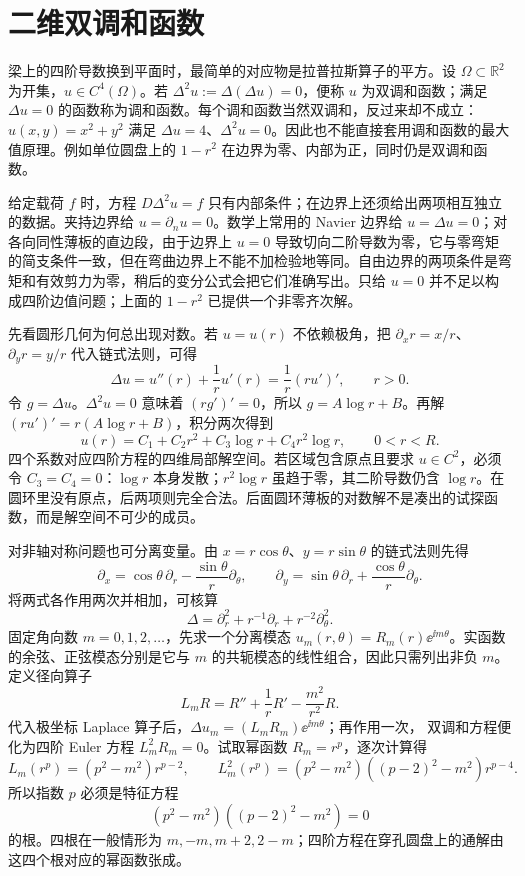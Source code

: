 \section{二维双调和函数}
\label{sec:phys-cont-biharmonic-primer}

梁上的四阶导数换到平面时，最简单的对应物是拉普拉斯算子的平方。设 $\Omega\subset\mathbb R^2$ 为开集，$u\in C^4(\Omega)$。若 $\Delta^2u:=\Delta(\Delta u)=0$，便称 $u$ 为双调和函数；满足 $\Delta u=0$ 的函数称为调和函数。每个调和函数当然双调和，反过来却不成立：$u(x,y)=x^2+y^2$ 满足 $\Delta u=4$、$\Delta^2u=0$。因此也不能直接套用调和函数的最大值原理。例如单位圆盘上的 $1-r^2$ 在边界为零、内部为正，同时仍是双调和函数。

给定载荷 $f$ 时，方程 $D\Delta^2u=f$ 只有内部条件；在边界上还须给出两项相互独立的数据。夹持边界给 $u=\partial_nu=0$。数学上常用的 Navier 边界给 $u=\Delta u=0$；对各向同性薄板的直边段，由于边界上 $u=0$ 导致切向二阶导数为零，它与零弯矩的简支条件一致，但在弯曲边界上不能不加检验地等同。自由边界的两项条件是弯矩和有效剪力为零，稍后的变分公式会把它们准确写出。只给 $u=0$ 并不足以构成四阶边值问题；上面的 $1-r^2$ 已提供一个非零齐次解。

先看圆形几何为何总出现对数。若 $u=u(r)$ 不依赖极角，把 $\partial_xr=x/r$、$\partial_yr=y/r$ 代入链式法则，可得
\begin{equation}
\Delta u=u''(r)+\frac1r u'(r)=\frac1r(ru')',\qquad r>0.
\label{eq:phys-cont-radial-laplacian}
\end{equation}
令 $g=\Delta u$。$\Delta^2u=0$ 意味着 $(rg')'=0$，所以 $g=A\log r+B$。再解 $(ru')'=r(A\log r+B)$，积分两次得到
\begin{equation}
u(r)=C_1+C_2r^2+C_3\log r+C_4r^2\log r,\qquad 0<r<R.
\label{eq:phys-cont-radial-biharmonic-basis}
\end{equation}
四个系数对应四阶方程的四维局部解空间。若区域包含原点且要求 $u\in C^2$，必须令 $C_3=C_4=0$：$\log r$ 本身发散；$r^2\log r$ 虽趋于零，其二阶导数仍含 $\log r$。在圆环里没有原点，后两项则完全合法。后面圆环薄板的对数解不是凑出的试探函数，而是解空间不可少的成员。

对非轴对称问题也可分离变量。由 $x=r\cos\theta$、$y=r\sin\theta$ 的链式法则先得
\[
\partial_x=\cos\theta\,\partial_r-\frac{\sin\theta}{r}\partial_\theta,
\qquad
\partial_y=\sin\theta\,\partial_r+\frac{\cos\theta}{r}\partial_\theta.
\]
将两式各作用两次并相加，可核算
\[
\Delta=\partial_r^2+r^{-1}\partial_r+r^{-2}\partial_\theta^2.
\]
固定角向数 $m=0,1,2,\ldots$，先求一个分离模态
$u_m(r,\theta)=R_m(r)\ee^{\ii m\theta}$。实函数的余弦、正弦模态分别是它与
$m$ 的共轭模态的线性组合，因此只需列出非负 $m$。定义径向算子
\[
L_mR=R''+\frac1rR'-\frac{m^2}{r^2}R.
\]
代入极坐标 Laplace 算子后，$\Delta u_m=(L_mR_m)\ee^{\ii m\theta}$；再作用一次，
双调和方程便化为四阶 Euler 方程 $L_m^2R_m=0$。试取幂函数 $R_m=r^p$，逐次计算得
\[
L_m(r^p)=(p^2-m^2)r^{p-2},\qquad
L_m^2(r^p)=(p^2-m^2)((p-2)^2-m^2)r^{p-4}.
\]
所以指数 $p$ 必须是特征方程
\[
(p^2-m^2)((p-2)^2-m^2)=0
\]
的根。四根在一般情形为 $m,-m,m+2,2-m$；四阶方程在穿孔圆盘上的通解由这四个根对应的幂函数张成。

